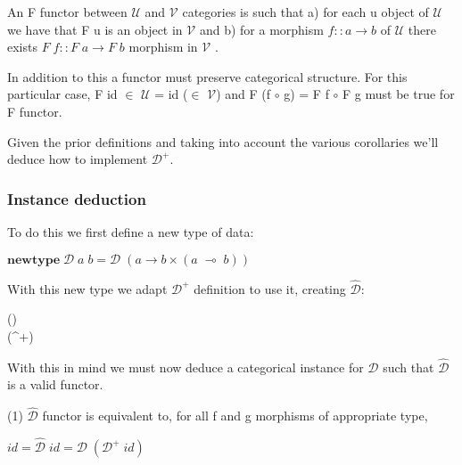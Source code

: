 \documentclass[11pt,a4]{article}
\newcommand{\Conid}[1]{\mathit{#1}}
\newcommand{\Varid}[1]{\mathit{#1}}
\def\resethooks{%
  \global\let\SaveRestoreHook\empty
  \global\let\ColumnHook\empty}
\let\hspre\empty
\let\hspost\empty
\theoremstyle{definition}
\theoremstyle{Definition}
\theoremstyle{Definition}
\begin{document}
An F functor between \ensuremath{\mathcal{U}} and \ensuremath{\mathcal{V}} categories is such that a) for each u object of \ensuremath{\mathcal{U}} we have that F u is an object in \ensuremath{\mathcal{V}} and b) for a morphism \ensuremath{\Varid{f}\mathbin{::}\Varid{a}\rightarrow \Varid{b}} of \ensuremath{\mathcal{U}} there exists \ensuremath{\Conid{F}\;\Varid{f}\mathbin{::}\Conid{F}\;\Varid{a}\rightarrow \Conid{F}\;\Varid{b}} morphism in \ensuremath{\mathcal{V}} .

In addition to this a functor must preserve categorical structure.
For this particular case, F id $\in$ \ensuremath{\mathcal{U}} = id ($\in$ \ensuremath{\mathcal{V}}) and F (f $\circ$ g) = F f $\circ$ F g must be true for F functor.

Given the prior definitions and taking into account the various corollaries we'll deduce how to implement \ensuremath{\mathcal{D}^{+}}.

\subsubsection{Instance deduction}

To do this we first define a new type of data:

\ensuremath{\mathbf{newtype}\;\mathcal{D}\;\Varid{a}\;\Varid{b}\mathrel{=}\mathcal{D}\;(\Varid{a}\rightarrow \Varid{b} \times (\Varid{a}\;\multimap \;\Varid{b}))}

With this new type we adapt \ensuremath{\mathcal{D}^{+}} definition to use it, creating \ensuremath{\mathcal{\hat{D}}}:

\begin{hscode}\SaveRestoreHook
\column{B}{@{}>{\hspre}l<{\hspost}@{}}%
\column{E}{@{}>{\hspre}l<{\hspost}@{}}%
\>[B]{}\mathbin{::}(\Varid{a}\rightarrow \Varid{b})\rightarrow {}\;\Varid{a}\;\Varid{b}{}\<[E]%
\\
\>[B]{}\;\Varid{f}\mathrel{=}\;(^{+}\;\Varid{f}){}\<[E]%
\ColumnHook
\end{hscode}\resethooks

With this in mind we must now deduce a categorical instance for \ensuremath{\mathcal{D}} such that \ensuremath{\mathcal{\hat{D}}} is a valid functor.


(1) \ensuremath{\mathcal{\hat{D}}} functor is equivalent to, for all f and g morphisms of appropriate type,

    \ensuremath{\Varid{id}\mathrel{=}\mathcal{\hat{D}}\;\Varid{id}\mathrel{=}\mathcal{D}\;(\mathcal{D}^{+}\;\Varid{id})}
\end{document}
